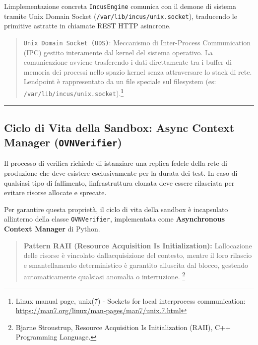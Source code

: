 L\textquotesingle implementazione concreta
\passthrough{\lstinline!IncusEngine!} comunica con il demone di sistema
tramite Unix Domain Socket
(\passthrough{\lstinline!/var/lib/incus/unix.socket!}), traducendo le
primitive astratte in chiamate REST HTTP asincrone.

\begin{quote}
\passthrough{\lstinline!Unix Domain Socket (UDS)!}: Meccanismo di
Inter-Process Communication (IPC) gestito interamente dal kernel del
sistema operativo. La comunicazione avviene trasferendo i dati
direttamente tra i buffer di memoria dei processi nello spazio kernel
senza attraversare lo stack di rete. L\textquotesingle endpoint è
rappresentato da un file speciale sul filesystem (es:
\passthrough{\lstinline!/var/lib/incus/unix.socket!}).\footnote{\label{fn:ref_21}Linux
  manual page, unix(7) - Sockets for local interprocess communication:
  \url{https://man7.org/linux/man-pages/man7/unix.7.html}}
\end{quote}

\begin{center}\rule{0.5\linewidth}{0.5pt}\end{center}

\subsection{\texorpdfstring{Ciclo di Vita della Sandbox: Async Context
Manager
(\texttt{OVNVerifier})}{Ciclo di Vita della Sandbox: Async Context Manager (OVNVerifier)}}\label{ciclo-di-vita-della-sandbox-async-context-manager-ovnverifier}

Il processo di verifica richiede di istanziare una replica fedele della
rete di produzione che deve esistere esclusivamente per la durata dei
test. In caso di qualsiasi tipo di fallimento,
l\textquotesingle infrastruttura clonata deve essere rilasciata per
evitare risorse allocate e sprecate.

Per garantire questa proprietà, il ciclo di vita della sandbox è
incapsulato all\textquotesingle interno della classe
\passthrough{\lstinline!OVNVerifier!}, implementata come
\textbf{Asynchronous Context Manager} di Python.

\begin{quote}
\textbf{Pattern RAII (Resource Acquisition Is Initialization):}
L\textquotesingle allocazione delle risorse è vincolato
dall\textquotesingle acquisizione del contesto, mentre il loro rilascio
e smantellamento deterministico è garantito all\textquotesingle uscita
dal blocco, gestendo automaticamente qualsiasi anomalia o interruzione.
\footnote{\label{fn:ref_22}Bjarne Stroustrup, Resource Acquisition Is Initialization
  (RAII), C++ Programming Language.}
\end{quote}

